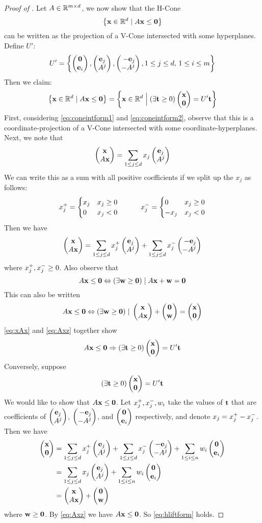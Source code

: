 \begin{proof}[Proof of {\Hlift}]
Let $A \in \mathbb{R}^{{m}\times d}$, we now show that the H-Cone 
  \[\left\{\mathbf{x} \in \mathbb{R}^d \;|\; A\mathbf{x} \leq \mathbf{0}\right\}\]
can be written as the projection of a V-Cone intersected with some hyperplanes.  Define $U'$:
  \[ U' = \set{\zei, \eAj, \neAj, 1 \leq j \leq d,\, 1 \leq i \leq m} \]
  Then we claim:
\begin{equation}\label{eq:hliftform}
   \set{\xv \st A\x \leq \0} = \set{\xv \St (\exists \t \geq 0) \xz = U'\t}
\end{equation}
  First, considering \eqref{eq:coneintform1} and \eqref{eq:coneintform2}, observe that this is a coordinate-projection of a V-Cone intersected with some coordinate-hyperplanes.
Next, we note that
  \[ \xAx = \jsum x_j \eAj \]
We can write this as a sum with all positive coefficients if we split up the $x_j$ as follows:
\[
   x_j^+ = \begin{cases} x_j & x_j \geq 0 \\ 0 & x_j < 0 \end{cases} \quad\quad\quad
   x_j^- = \begin{cases} 0 & x_j \geq 0 \\ -x_j & x_j < 0 \end{cases}
\]
Then we have
\begin{equation} \label{eq:xAx}
  \xAx = \jsum \xjp \eAj + \jsum \xjm \neAj
\end{equation}
where $x_j^+, x_j^- \geq 0$.  Also observe that
  \[ A\mathbf{x} \leq \mathbf{0} \Leftrightarrow (\exists \mathbf{w} \geq \mathbf{0}) \;|\; A\mathbf{x} + \mathbf{w} = \mathbf{0} \]
This can also be written
\begin{equation} \label{eq:Axz}
  A\x \leq \0 \Leftrightarrow (\exists \w \geq \0) \st \xAx + \zw = \xz
\end{equation}
\eqref{eq:xAx} and \eqref{eq:Axz} together show
\[ A\x \leq \0 \Rightarrow (\exists \t \geq 0) \xz = U'\t \]
Conversely, suppose
\[ (\exists \t \geq 0) \xz = U'\t \]
We would like to show that $A\mathbf{x} \leq \mathbf{0}$.  Let $x_j^+,x_j^-,w_i$ take the values of $\mathbf{t}$ that are coefficients of $\eAj$, $\neAj$, and $\zei$ respectively, and denote $x_j = x_j^+ - x_j^-$.  Then we have
\begin{align*} 
\xz &= \jsum \xjp \eAj + \jsum \xjm \neAj + \isum w_i\zei\\
    &= \jsum x_j \eAj + \isum w_i\zei \\
    &= \xAx + \zw
\end{align*}
where $\mathbf{w} \geq \mathbf{0}$.  By \eqref{eq:Axz} we have $A\mathbf{x} \leq \mathbf{0}$.  So \eqref{eq:hliftform} holds.
\end{proof}

